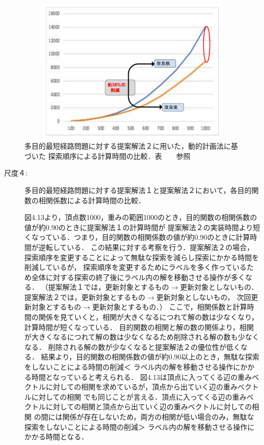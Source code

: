 \documentclass[12pt]{optlab-bachelor}
\begin{document}
\begin{figure}[htbp]
  \centering
  \includegraphics[height=7.0cm , width=15.0cm]{fig/fig15.pdf}
  \caption{多目的最短経路問題に対する提案解法２に用いた，動的計画法に基づいた
  探索順序による計算時間の比較．表　　参照}
\end{figure}


\begin{description}
  \item[尺度４:]
  多目的最短経路問題に対する提案解法１と提案解法２において，各目的関数の相関係数による計算時間の比較．

  図4.13より，頂点数1000，重みの範囲1000のとき，目的関数の相関係数の値が約0.90のときに提案解法１の計算時間が
  提案解法２の実装時間より短くなっている．つまり，目的関数の相関係数の値が約0.90のときに計算時間が逆転している．
  この結果に対する考察を行う．提案解法２の場合，探索順序を変更することによって無駄な探索を減らし探索にかかる時間を削減しているが，
  探索順序を変更するためにラベルを多く作っているため全体に対する探索の終了後にラベル内の解を移動させる操作が多くなる．
  （提案解法１では，更新対象とするもの$\rightarrow$更新対象としないもの．提案解法２では，更新対象とするもの$\rightarrow$更新対象としないもの，
  次回更新対象とするもの$\rightarrow$更新対象とするもの．）
  ここで，相関係数と計算時間の関係を見ていくと，相関が大きくなるにつれて解の数は少なくなり，計算時間が短くなっている．
  目的関数の相関と解の数の関係より，相関が大きくなるにつれて解の数は少なくなるため削除される解の数も少なくなる．
  削除される解の数が少なくなると提案解法２の優位性が低くなる．
  結果より，目的関数の相関係数の値が約0.90以上のとき，無駄な探索をしないことによる時間の削減＜
  ラベル内の解を移動させる操作にかかる時間となっていると考えられる．
  図4.13は頂点に入ってくる辺の重みベクトルに対しての相関を求めているが，頂点から出ていく辺の重みベクトルに対しての相関
  でも同じことが言える．頂点に入ってくる辺の重みベクトルに対しての相関と頂点から出ていく辺の重みベクトルに対しての相関
  の間には関係が存在しないため，両方の相関が低い場合のみ，無駄な探索をしないことによる時間の削減＞
  ラベル内の解を移動させる操作にかかる時間となる．

\end{description}
\end{document}
